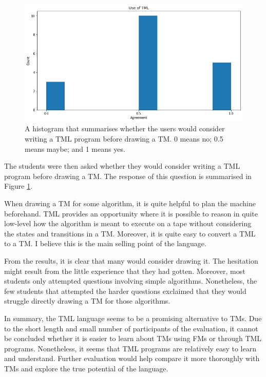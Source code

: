 \begin{figure}[htb]
    \centering
    \includegraphics[scale=0.35]{data/use-tml.png}
    \caption{A histogram that summarises whether the users would consider writing a TML program before drawing a TM. 0 means no; 0.5 means maybe; and 1 means yes.}
    \label{fig:use-tml}
\end{figure}

The students were then asked whether they would consider writing a TML program before drawing a TM. The response of this question is summarised in Figure \ref{fig:use-tml}. 

When drawing a TM for some algorithm, it is quite helpful to plan the machine beforehand. TML provides an opportunity where it is possible to reason in quite low-level how the algorithm is meant to execute on a tape without considering the states and transitions in a TM. Moreover, it is quite easy to convert a TML to a TM. I believe this is the main selling point of the language. 

From the results, it is clear that many would consider drawing it. The hesitation might result from the little experience that they had gotten. Moreover, most students only attempted questions involving simple algorithms. Nonetheless, the few students that attempted the harder questions exclaimed that they would struggle directly drawing a TM for those algorithms.

In summary, the TML language seems to be a promising alternative to TMs. Due to the short length and small number of participants of the evaluation, it cannot be concluded whether it is easier to learn about TMs using FMs or through TML programs. Nonetheless, it seems that TML programs are relatively easy to learn and understand. Further evaluation would help compare it more thoroughly with TMs and explore the true potential of the language.


